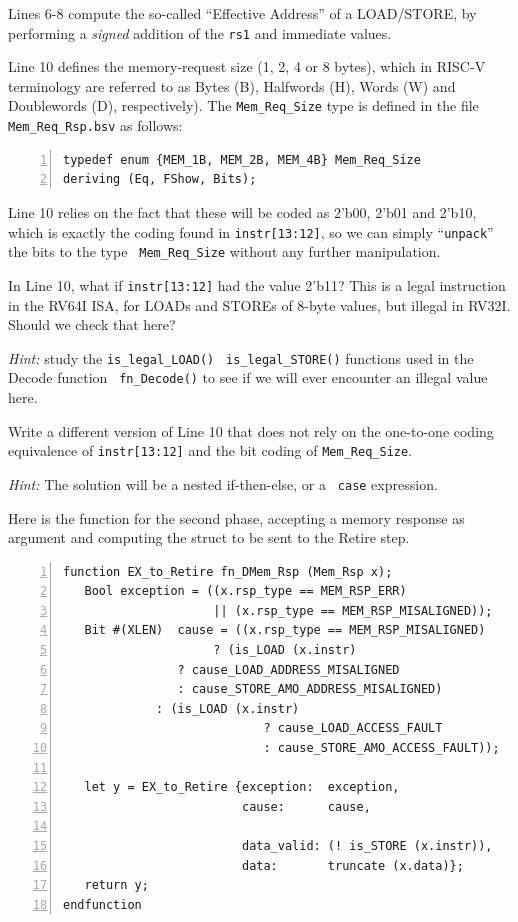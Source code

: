 Lines 6-8 compute the so-called ``Effective Address'' of a LOAD/STORE,
by performing a \emph{signed} addition of the {\tt rs1} and immediate
values.

Line 10 defines the memory-request size (1, 2, 4 or 8 bytes), which in
RISC-V terminology are referred to as Bytes (B), Halfwords (H), Words
(W) and Doublewords (D), respectively).  The {\tt Mem\_Req\_Size} type
is defined in the file {\tt Mem\_Req\_Rsp.bsv} as follows:

{\small
\begin{Verbatim}[frame=single, numbers=left]
typedef enum {MEM_1B, MEM_2B, MEM_4B} Mem_Req_Size
deriving (Eq, FShow, Bits);
\end{Verbatim}
}

Line 10 relies on the fact that these will be coded as 2'b00, 2'b01
and 2'b10, which is exactly the coding found in {\tt instr[13:12]}, so
we can simply ``{\tt unpack}'' the bits to the type {\tt
Mem\_Req\_Size} without any further manipulation.

\hdivider

\Exercise

In Line 10, what if {\tt instr[13:12]} had the value 2'b11?  This is a
legal instruction in the RV64I ISA, for LOADs and STOREs of 8-byte
values, but illegal in RV32I.  Should we check that here?

\emph{Hint:} study the {\tt is\_legal\_LOAD()} {\tt
is\_legal\_STORE()} functions used in the Decode function {\tt
fn\_Decode()} to see if we will ever encounter an illegal value here.

\Exercise

Write a different version of Line 10 that does not rely on the
one-to-one coding equivalence of {\tt instr[13:12]} and the bit coding
of {\tt Mem\_Req\_Size}.

\emph{Hint:} The solution will be a nested if-then-else, or a {\tt
case} expression.

\Endexercise

Here is the function for the second phase, accepting a memory response
as argument and computing the struct to be sent to the Retire step.

{\small
\begin{Verbatim}[frame=single, numbers=left]
function EX_to_Retire fn_DMem_Rsp (Mem_Rsp x);
   Bool exception = ((x.rsp_type == MEM_RSP_ERR)
                     || (x.rsp_type == MEM_RSP_MISALIGNED));
   Bit #(XLEN)  cause = ((x.rsp_type == MEM_RSP_MISALIGNED)
       		      	 ? (is_LOAD (x.instr)
			    ? cause_LOAD_ADDRESS_MISALIGNED
			    : cause_STORE_AMO_ADDRESS_MISALIGNED)
			 : (is_LOAD (x.instr)
                            ? cause_LOAD_ACCESS_FAULT
                            : cause_STORE_AMO_ACCESS_FAULT));

   let y = EX_to_Retire {exception:  exception,
                         cause:      cause,

                         data_valid: (! is_STORE (x.instr)),
                         data:       truncate (x.data)};
   return y;
endfunction
\end{Verbatim}
}

